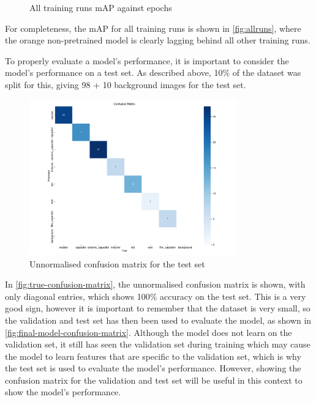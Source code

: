 \begin{figure}[H]
  \centering
  
  \caption{All training runs mAP against epochs}
  \label{fig:allruns}
\end{figure}

For completeness, the mAP for all training runs is shown in \autoref{fig:allruns}, where the orange non-pretrained model is clearly lagging behind all other training runs.

To properly evaluate a model's performance, it is important to consider the model's performance on a test set. As described above, 10\% of the dataset was split for this, giving 98 + 10 background images for the test set.

\begin{figure}[H]
  \centering
  \includegraphics[width=0.8\textwidth]{imgs/graphs/confusion_matrix_final.png}
  \caption{Unnormalised confusion matrix for the test set}
  \label{fig:true-confusion-matrix}
\end{figure}

In \autoref{fig:true-confusion-matrix}, the unnormalised confusion matrix is shown, with only diagonal entries, which shows 100\% accuracy on the test set. This is a very good sign, however it is important to remember that the dataset is very small, so the validation and test set has then been used to evaluate the model, as shown in \autoref{fig:final-model-confusion-matrix}. Although the model does not learn on the validation set, it still has seen the validation set during training which may cause the model to learn features that are specific to the validation set, which is why the test set is used to evaluate the model's performance. However, showing the confusion matrix for the validation and test set will be useful in this context to show the model's performance.

